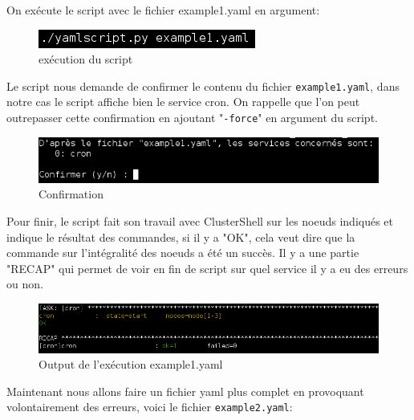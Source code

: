 \documentclass[a4paper,11pt]{article}
\begin{document}
On exécute le script avec le fichier example1.yaml en argument:
\smallbreak
\begin{figure}[hbtp]
\centering
\includegraphics[scale=0.7]{execution_yaml.png}
\caption{exécution du script}
\end{figure}
Le script nous demande de confirmer le contenu du fichier \verb?example1.yaml?, dans notre cas le script affiche bien le service cron. On rappelle que l'on peut outrepasser cette confirmation en ajoutant "\verb?-force?" en argument du script.
\smallbreak

\begin{figure}[H]
		\centerline{\includegraphics[scale=0.7]{confirmation_yaml.png}}
		\caption{Confirmation}
\end{figure}
\pagebreak
Pour finir, le script fait son travail avec ClusterShell sur les noeuds indiqués et indique le résultat des commandes, si il y a "OK", cela veut dire que la commande sur l'intégralité des noeuds a été un succès. Il y a une partie "RECAP" qui permet de voir en fin de script sur quel service il y a eu des erreurs ou non.
\smallbreak

\begin{figure}[H]
		\centerline{\includegraphics[scale=0.6]{resultat_yaml.png}}
		\caption{Output de l'exécution example1.yaml}
\end{figure}

Maintenant nous allons faire un fichier yaml plus complet en provoquant volontairement des erreurs, voici le fichier \verb?example2.yaml?:
\end{document}

